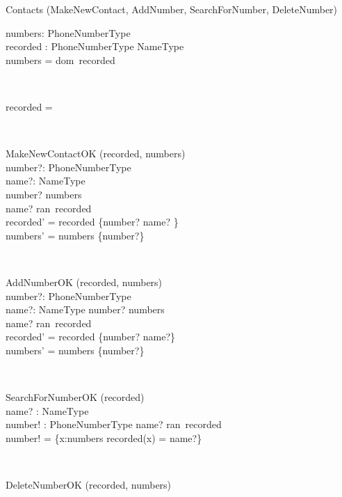 \begin{class}{Contacts}
\also
\upharpoonright (MakeNewContact, AddNumber, SearchForNumber, DeleteNumber) \\
\begin{state}
numbers:  PhoneNumberType\\
recorded : PhoneNumberType \pfun NameType\\
\where
numbers = dom~recorded
\end{state} \\
\begin{init}
recorded = \emptyset %
\end{init} \\
\begin{op}{MakeNewContactOK}
\Delta (recorded, numbers) \\
number?: PhoneNumberType \\
name?: NameType \\
\ST
number? \notin numbers \\
name? \notin ran~recorded \\
recorded' = recorded \cup \{number? \mapsto name? \}\\
numbers' = numbers \cup \{number?\} \\
\end{op}\\
\begin{op}{AddNumberOK}
\Delta (recorded, numbers) \\
number?: PhoneNumberType \\
name?: NameType
\ST
number? \notin numbers \\
name? \in ran~recorded \\
recorded' = recorded \cup \{number? \mapsto name?\} \\
numbers' = numbers \cup \{number?\} \\
\end{op}\\
\begin{op}{SearchForNumberOK}
    \Xi (recorded) \\
    name? : NameType\\
    number! :  PhoneNumberType
    \ST
    name? \in ran~recorded\\
    number! = \{x:numbers  \mid recorded(x) = name?\}
\end{op}\\
\begin{op}{DeleteNumberOK}
\Delta (recorded, numbers) \\

\end{op}
\end{class}
